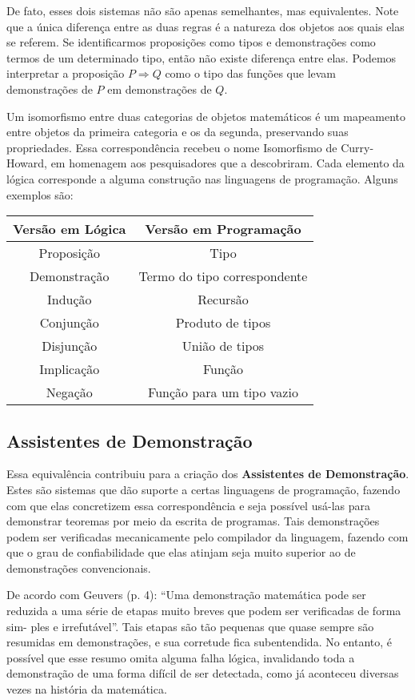 \documentclass[12pt, oneside, a4paper,english,brazil]{abntex2}
\begin{document}
\qquad De fato, esses dois sistemas não são apenas semelhantes, mas equivalentes. Note
que a única diferença entre as duas regras é a natureza dos objetos aos quais elas se referem.
Se identificarmos proposições como tipos e demonstrações como termos de um determinado
tipo, então não existe diferença entre elas. Podemos interpretar a proposição $P \Rightarrow Q$ como
o tipo das funções que levam demonstrações de $P$ em demonstrações de $Q$.

\qquad Um isomorfismo entre duas categorias de objetos matemáticos é um mapeamento
entre objetos da primeira categoria e os da segunda, preservando suas propriedades.
Essa correspondência recebeu o nome Isomorfismo de Curry-Howard, em homenagem
aos pesquisadores que a descobriram. Cada elemento da lógica corresponde a alguma
construção nas linguagens de programação. Alguns exemplos são:
\begin{table}[H]
  \centering
    \begin{tabular}{cc}\toprule
      Versão em Lógica & Versão em Programação  \\\midrule
      Proposição & Tipo \\
      Demonstração & Termo do tipo correspondente \\
      Indução & Recursão \\
      Conjunção & Produto de tipos \\
      Disjunção & União de tipos \\
      Implicação & Função \\
      Negação & Função para um tipo vazio \\\bottomrule
    \end{tabular}
\end{table}

\subsection*{Assistentes de Demonstra\c{c}\~ao}
\qquad Essa equivalência contribuiu para a cria\c{c}\~ao dos \textbf{Assistentes de Demonstra\c{c}\~ao}. Estes
são sistemas que dão suporte a certas linguagens de programação, fazendo com que elas
concretizem essa correspondência e seja possível usá-las para demonstrar teoremas por
meio da escrita de programas. Tais demonstrações podem ser verificadas mecanicamente
pelo compilador da linguagem, fazendo com que o grau de confiabilidade que elas atinjam
seja muito superior ao de demonstrações convencionais.

\qquad De acordo com Geuvers\cite{geuvers} (p. 4): ``Uma demonstração matemática pode ser
reduzida a uma série de etapas muito breves que podem ser verificadas de forma sim-
ples e irrefutável''. Tais etapas são tão pequenas que quase sempre são resumidas em
demonstrações, e sua corretude fica subentendida. No entanto, é possível que esse resumo
omita alguma falha lógica, invalidando toda a demonstração de uma forma difícil de ser
detectada, como j\'a aconteceu diversas vezes na hist\'oria da matem\'atica.
\end{document}
